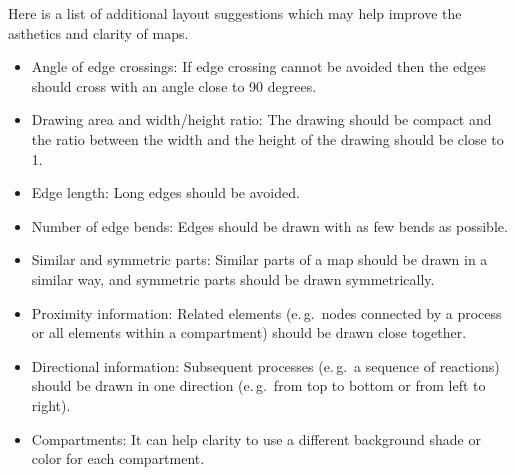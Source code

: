 Here is a list of additional layout suggestions which may help improve the asthetics and clarity of \PD maps.

\begin{itemize}
  \item Angle of edge crossings: If edge crossing cannot be avoided then the edges should cross with an angle close to 90 degrees.
 \item Drawing area and width/height ratio: The drawing should
  be compact and the ratio between the width and the height
  of the drawing should be close to 1.
  \item Edge length: Long edges should be avoided.
  \item Number of edge bends: Edges should be drawn with
  as few bends as possible.
  \item Similar and symmetric parts: Similar parts of a map
  should be drawn in a similar way, and symmetric parts
  should be drawn symmetrically.
  \item Proximity information: Related elements (e.\,g.~nodes
  connected by a process or all elements within a compartment)
  should be drawn close together.
  \item Directional information: Subsequent processes (e.\,g.~a sequence
  of reactions) should be drawn in one direction (e.\,g.~from
  top to bottom or from left to right).
  \item Compartments: It can help clarity to use a different background shade or color for each compartment.
\end{itemize}
